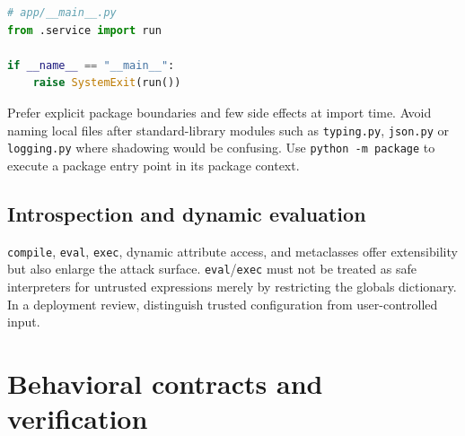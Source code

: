 \documentclass[
  11pt,
]{report}
\newcommand{\passthrough}[1]{#1}
\begin{document}
\begin{lstlisting}[language=Python]
# app/__main__.py
from .service import run

if __name__ == "__main__":
    raise SystemExit(run())
\end{lstlisting}

Prefer explicit package boundaries and few side effects at import time.
Avoid naming local files after standard-library modules such as
\passthrough{\lstinline!typing.py!}, \passthrough{\lstinline!json.py!}
or \passthrough{\lstinline!logging.py!} where shadowing would be
confusing. Use \passthrough{\lstinline!python -m package!} to execute a
package entry point in its package context.

\section{Introspection and dynamic
evaluation}\label{introspection-and-dynamic-evaluation}

\passthrough{\lstinline!compile!}, \passthrough{\lstinline!eval!},
\passthrough{\lstinline!exec!}, dynamic attribute access, and
metaclasses offer extensibility but also enlarge the attack surface.
\passthrough{\lstinline!eval!}/\passthrough{\lstinline!exec!} must not
be treated as safe interpreters for untrusted expressions merely by
restricting the globals dictionary. In a deployment review, distinguish
trusted configuration from user-controlled input.

\chapter{Behavioral contracts and
verification}\label{behavioral-contracts-and-verification}
\end{document}
